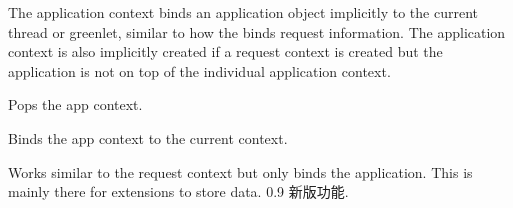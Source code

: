 \documentclass[a4paper,12pt]{sphinxmanual}
\begin{document}
\begin{fulllineitems}
\label{api:flask.ctx.AppContext}
The application context binds an application object implicitly
to the current thread or greenlet, similar to how the
 binds request information.  The application
context is also implicitly created if a request context is created
but the application is not on top of the individual application
context.

\begin{fulllineitems}
\label{api:flask.ctx.AppContext.pop}
Pops the app context.

\end{fulllineitems}


\begin{fulllineitems}
\label{api:flask.ctx.AppContext.push}
Binds the app context to the current context.

\end{fulllineitems}


\end{fulllineitems}


\begin{fulllineitems}
\label{api:flask._app_ctx_stack}
Works similar to the request context but only binds the application.
This is mainly there for extensions to store data.
0.9 新版功能.
\end{fulllineitems}

\end{document}
